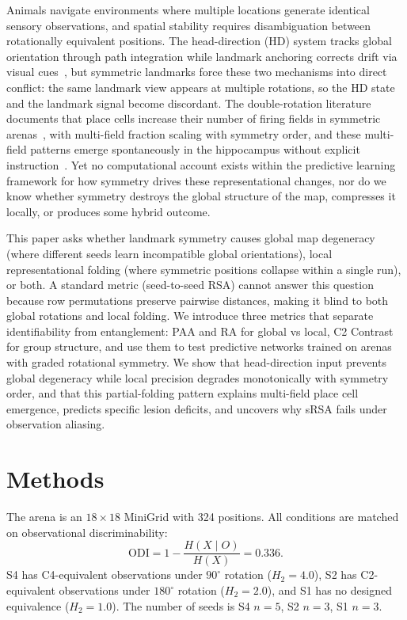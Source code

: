 \documentclass[11pt, a4paper]{article}
\begin{document}
Animals navigate environments where multiple locations generate identical sensory observations, and spatial stability requires disambiguation between rotationally equivalent positions. The head-direction (HD) system tracks global orientation through path integration while landmark anchoring corrects drift via visual cues~\cite{taube1990, knierim1995}, but symmetric landmarks force these two mechanisms into direct conflict: the same landmark view appears at multiple rotations, so the HD state and the landmark signal become discordant. The double-rotation literature documents that place cells increase their number of firing fields in symmetric arenas~\cite{muller1987, knierim1995}, with multi-field fraction scaling with symmetry order, and these multi-field patterns emerge spontaneously in the hippocampus without explicit instruction~\cite{leutgeb2005}. Yet no computational account exists within the predictive learning framework for how symmetry drives these representational changes, nor do we know whether symmetry destroys the global structure of the map, compresses it locally, or produces some hybrid outcome.

This paper asks whether landmark symmetry causes global map degeneracy (where different seeds learn incompatible global orientations), local representational folding (where symmetric positions collapse within a single run), or both. A standard metric (seed-to-seed RSA) cannot answer this question because row permutations preserve pairwise distances, making it blind to both global rotations and local folding. We introduce three metrics that separate identifiability from entanglement: PAA and RA for global vs local, C2 Contrast for group structure, and use them to test predictive networks trained on arenas with graded rotational symmetry. We show that head-direction input prevents global degeneracy while local precision degrades monotonically with symmetry order, and that this partial-folding pattern explains multi-field place cell emergence, predicts specific lesion deficits, and uncovers why sRSA fails under observation aliasing.

\clearpage

\section*{Methods}

The arena is an $18 \times 18$ MiniGrid with 324 positions. All conditions are matched on observational discriminability:
\[
\mathrm{ODI}=1-\frac{H(X\mid O)}{H(X)}=0.336.
\]
S4 has C4-equivalent observations under $90^{\circ}$ rotation ($H_2=4.0$), S2 has C2-equivalent observations under $180^{\circ}$ rotation ($H_2=2.0$), and S1 has no designed equivalence ($H_2=1.0$). The number of seeds is S4 $n=5$, S2 $n=3$, S1 $n=3$.
\end{document}
